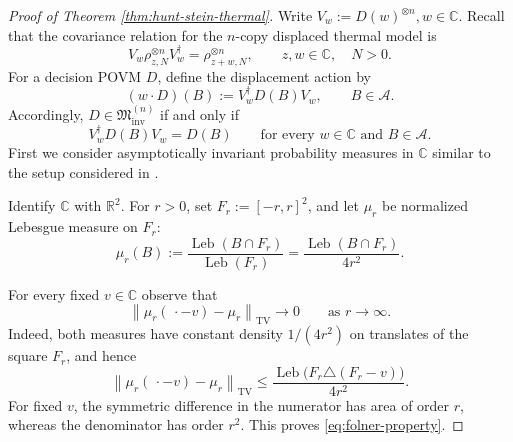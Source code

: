 \documentclass{article}
\theoremstyle{named}
\theoremstyle{named1}
\newcommand{\bbC}{\mathbb C}
\newcommand{\bbR}{\mathbb R}
\newcommand{\cM}{\mathfrak M}
\theoremstyle{plain}
\theoremstyle{remark}
\begin{document}
\begin{proof}[Proof of Theorem \ref{thm:hunt-stein-thermal}]
Write
$V_w:=D(w)^{\otimes n},
    w\in\bbC.$
Recall that the covariance relation for the \(n\)-copy displaced thermal model is
\begin{equation}
    V_w\rho_{z,N}^{\otimes n}V_w^\dagger
    =
    \rho_{z+w,N}^{\otimes n},
    \qquad
    z,w\in\bbC,\quad N>0.
    \label{eq:n-copy-displacement-covariance}
\end{equation}
For a decision POVM \(D\), define the displacement action by
\begin{equation}
    (w\cdot D)(B)
    :=
    V_w^\dagger D(B)V_w,
    \qquad
    B\in\mathcal A.
    \label{eq:displacement-action-decision-povm}
\end{equation}
Accordingly,
$D\in\cM_{\mathrm{inv}}^{(n)}$
if and only if
\begin{equation}
    V_w^\dagger D(B)V_w=D(B)
    \qquad
    \text{for every }w\in\bbC
    \text{ and }B\in\mathcal A.
    \label{eq:decision-povm-invariance}
\end{equation}
First we consider asymptotically invariant probability measures in $\bbC$ similar to the setup considered in \cite{KumagaiHayashi2013}.

Identify \(\bbC\) with \(\bbR^2\). For \(r>0\), set
$F_r:=[-r,r]^2$, 
and let \(\mu_r\) be normalized Lebesgue measure on \(F_r\):
\begin{equation}
    \mu_r(B)
    :=
    \frac{\operatorname{Leb}(B\cap F_r)}
         {\operatorname{Leb}(F_r)}
    =
    \frac{\operatorname{Leb}(B\cap F_r)}
         {4r^2}.
    \label{eq:normalized-folner-measure}
\end{equation}

For every fixed \(v\in\bbC\) observe that
\begin{equation}
    \left\|
        \mu_r(\,\cdot-v)-\mu_r
    \right\|_{\mathrm{TV}}
    \rightarrow0
    \qquad
    \text{as }r\rightarrow\infty.
    \label{eq:folner-property}
\end{equation}
Indeed, both measures have constant density \(1/(4r^2)\) on translates of
the square \(F_r\), and hence
\begin{equation}
    \left\|
        \mu_r(\,\cdot-v)-\mu_r
    \right\|_{\mathrm{TV}}
    \leq
    \frac{
        \operatorname{Leb}
        \bigl(
            F_r\triangle(F_r-v)
        \bigr)
    }{4r^2}.
    \label{eq:folner-symmetric-difference}
\end{equation}
For fixed \(v\), the symmetric difference in the numerator has area of
order \(r\), whereas the denominator has order \(r^2\). This proves
\eqref{eq:folner-property}.



\end{proof}
\end{document}
